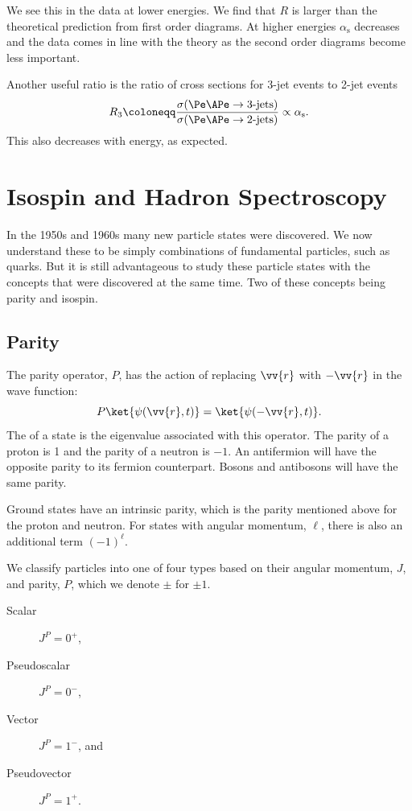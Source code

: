 \documentclass[fleqn]{NotesClass}
\newcommand*{\strong}{\mathrm{s}}
\begin{document}
    We see this in the data at lower energies.
    We find that \(R\) is larger than the theoretical prediction from first order diagrams.
    At higher energies \(\alpha_{\strong}\) decreases and the data comes in line with the theory as the second order diagrams become less important.
    
    Another useful ratio is the ratio of cross sections for 3-jet events to 2-jet events
    \begin{equation}
        R_3 \coloneqq \frac{\sigma(\Pe\APe \to \text{3-jets})}{\sigma(\Pe\APe \to \text{2-jets})} \propto \alpha_{\strong}.
    \end{equation}
    This also decreases with energy, as expected.
    
    \chapter{Isospin and Hadron Spectroscopy}
    In the 1950s and 1960s many new particle states were discovered.
    We now understand these to be simply combinations of fundamental particles, such as quarks.
    But it is still advantageous to study these particle states with the concepts that were discovered at the same time.
    Two of these concepts being parity and isospin.
    
    \section{Parity}
    The parity operator, \(P\), has the action of replacing \(\vv{r}\) with \(-\vv{r}\) in the wave function:
    \begin{equation}
        P\ket{\psi(\vv{r}, t)} = \ket{\psi(-\vv{r}, t)}.
    \end{equation}
    The  of a state is the eigenvalue associated with this operator.
    The parity of a proton is 1 and the parity of a neutron is \(-1\).
    An antifermion will have the opposite parity to its fermion counterpart.
    Bosons and antibosons will have the same parity.
    
    Ground states have an intrinsic parity, which is the parity mentioned above for the proton and neutron.
    For states with angular momentum, \(\ell\), there is also an additional term \((-1)^{\ell}\).
    
    We classify particles into one of four types based on their angular momentum, \(J\), and parity, \(P\), which we denote \(\pm\) for \(\pm 1\).
    \begin{description}
        \item[Scalar] \(J^P = 0^+\),
        \item[Pseudoscalar] \(J^P = 0^-\),
        \item[Vector] \(J^P = 1^-\), and
        \item[Pseudovector] \(J^P = 1^+\).
    \end{description}
    
\end{document}
